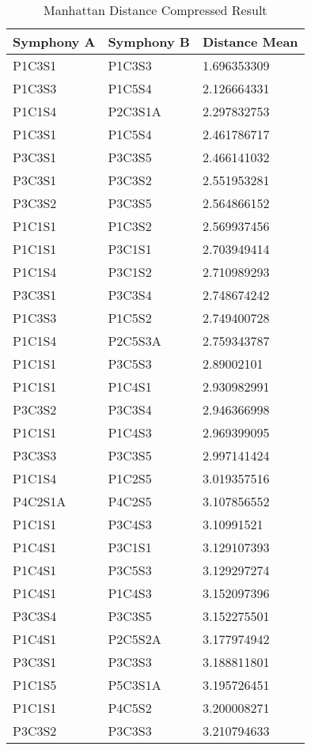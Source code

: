 \begin{longtable}{|l|l|l|}
\caption{Manhattan Distance Compressed Result}
\label{my-label}\\
\hline
Symphony A & Symphony B & Distance Mean \\ \hline
\endfirsthead
%
\endhead
%
P1C3S1 & P1C3S3 & 1.696353309 \\ \hline
P1C3S3 & P1C5S4 & 2.126664331 \\ \hline
P1C1S4 & P2C3S1A & 2.297832753 \\ \hline
P1C3S1 & P1C5S4 & 2.461786717 \\ \hline
P3C3S1 & P3C3S5 & 2.466141032 \\ \hline
P3C3S1 & P3C3S2 & 2.551953281 \\ \hline
P3C3S2 & P3C3S5 & 2.564866152 \\ \hline
P1C1S1 & P1C3S2 & 2.569937456 \\ \hline
P1C1S1 & P3C1S1 & 2.703949414 \\ \hline
P1C1S4 & P3C1S2 & 2.710989293 \\ \hline
P3C3S1 & P3C3S4 & 2.748674242 \\ \hline
P1C3S3 & P1C5S2 & 2.749400728 \\ \hline
P1C1S4 & P2C5S3A & 2.759343787 \\ \hline
P1C1S1 & P3C5S3 & 2.89002101 \\ \hline
P1C1S1 & P1C4S1 & 2.930982991 \\ \hline
P3C3S2 & P3C3S4 & 2.946366998 \\ \hline
P1C1S1 & P1C4S3 & 2.969399095 \\ \hline
P3C3S3 & P3C3S5 & 2.997141424 \\ \hline
P1C1S4 & P1C2S5 & 3.019357516 \\ \hline
P4C2S1A & P4C2S5 & 3.107856552 \\ \hline
P1C1S1 & P3C4S3 & 3.10991521 \\ \hline
P1C4S1 & P3C1S1 & 3.129107393 \\ \hline
P1C4S1 & P3C5S3 & 3.129297274 \\ \hline
P1C4S1 & P1C4S3 & 3.152097396 \\ \hline
P3C3S4 & P3C3S5 & 3.152275501 \\ \hline
P1C4S1 & P2C5S2A & 3.177974942 \\ \hline
P3C3S1 & P3C3S3 & 3.188811801 \\ \hline
P1C1S5 & P5C3S1A & 3.195726451 \\ \hline
P1C1S1 & P4C5S2 & 3.200008271 \\ \hline
P3C3S2 & P3C3S3 & 3.210794633 \\ \hline
\end{longtable}

